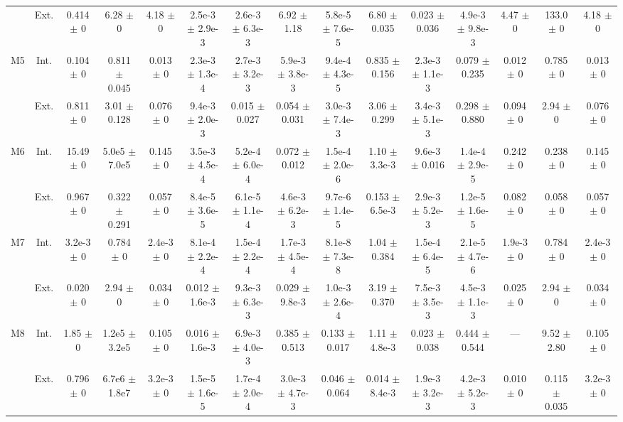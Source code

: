 \begin{table}[htbp]
{\begin{tabular}{@{}ccccccccccccccc@{}}
 & Ext. & 0.414 $\pm$ 0 & 6.28 $\pm$ 0 & 4.18 $\pm$ 0 & 2.5e-3 $\pm$ 2.9e-3 & 2.6e-3 $\pm$ 6.3e-3 & 6.92 $\pm$ 1.18 & 5.8e-5 $\pm$ 7.6e-5 & 6.80 $\pm$ 0.035 & 0.023 $\pm$ 0.036 & 4.9e-3 $\pm$ 9.8e-3 & 4.47 $\pm$ 0 & 133.0 $\pm$ 0 & 4.18 $\pm$ 0 \\
\cline{2-15}
\multirow{2}{*}{M5} & Int. & 0.104 $\pm$ 0 & 0.811 $\pm$ 0.045 & 0.013 $\pm$ 0 & 2.3e-3 $\pm$ 1.3e-4 & 2.7e-3 $\pm$ 3.2e-3 & 5.9e-3 $\pm$ 3.8e-3 & 9.4e-4 $\pm$ 4.3e-5 & 0.835 $\pm$ 0.156 & 2.3e-3 $\pm$ 1.1e-3 & 0.079 $\pm$ 0.235 & 0.012 $\pm$ 0 & 0.785 $\pm$ 0 & 0.013 $\pm$ 0 \\
 & Ext. & 0.811 $\pm$ 0 & 3.01 $\pm$ 0.128 & 0.076 $\pm$ 0 & 9.4e-3 $\pm$ 2.0e-3 & 0.015 $\pm$ 0.027 & 0.054 $\pm$ 0.031 & 3.0e-3 $\pm$ 7.4e-3 & 3.06 $\pm$ 0.299 & 3.4e-3 $\pm$ 5.1e-3 & 0.298 $\pm$ 0.880 & 0.094 $\pm$ 0 & 2.94 $\pm$ 0 & 0.076 $\pm$ 0 \\
\cline{2-15}
\multirow{2}{*}{M6} & Int. & 15.49 $\pm$ 0 & 5.0e5 $\pm$ 7.0e5 & 0.145 $\pm$ 0 & 3.5e-3 $\pm$ 4.5e-4 & 5.2e-4 $\pm$ 6.0e-4 & 0.072 $\pm$ 0.012 & 1.5e-4 $\pm$ 2.0e-6 & 1.10 $\pm$ 3.3e-3 & 9.6e-3 $\pm$ 0.016 & 1.4e-4 $\pm$ 2.9e-5 & 0.242 $\pm$ 0 & 0.238 $\pm$ 0 & 0.145 $\pm$ 0 \\
 & Ext. & 0.967 $\pm$ 0 & 0.322 $\pm$ 0.291 & 0.057 $\pm$ 0 & 8.4e-5 $\pm$ 3.6e-5 & 6.1e-5 $\pm$ 1.1e-4 & 4.6e-3 $\pm$ 6.2e-3 & 9.7e-6 $\pm$ 1.4e-5 & 0.153 $\pm$ 6.5e-3 & 2.9e-3 $\pm$ 5.2e-3 & 1.2e-5 $\pm$ 1.6e-5 & 0.082 $\pm$ 0 & 0.058 $\pm$ 0 & 0.057 $\pm$ 0 \\
\cline{2-15}
\multirow{2}{*}{M7} & Int. & 3.2e-3 $\pm$ 0 & 0.784 $\pm$ 0 & 2.4e-3 $\pm$ 0 & 8.1e-4 $\pm$ 2.2e-4 & 1.5e-4 $\pm$ 2.2e-4 & 1.7e-3 $\pm$ 4.5e-4 & 8.1e-8 $\pm$ 7.3e-8 & 1.04 $\pm$ 0.384 & 1.5e-4 $\pm$ 6.4e-5 & 2.1e-5 $\pm$ 4.7e-6 & 1.9e-3 $\pm$ 0 & 0.784 $\pm$ 0 & 2.4e-3 $\pm$ 0 \\
 & Ext. & 0.020 $\pm$ 0 & 2.94 $\pm$ 0 & 0.034 $\pm$ 0 & 0.012 $\pm$ 1.6e-3 & 9.3e-3 $\pm$ 6.3e-3 & 0.029 $\pm$ 9.8e-3 & 1.0e-3 $\pm$ 2.6e-4 & 3.19 $\pm$ 0.370 & 7.5e-3 $\pm$ 3.5e-3 & 4.5e-3 $\pm$ 1.1e-3 & 0.025 $\pm$ 0 & 2.94 $\pm$ 0 & 0.034 $\pm$ 0 \\
\cline{2-15}
\multirow{2}{*}{M8} & Int. & 1.85 $\pm$ 0 & 1.2e5 $\pm$ 3.2e5 & 0.105 $\pm$ 0 & 0.016 $\pm$ 1.6e-3 & 6.9e-3 $\pm$ 4.0e-3 & 0.385 $\pm$ 0.513 & 0.133 $\pm$ 0.017 & 1.11 $\pm$ 4.8e-3 & 0.023 $\pm$ 0.038 & 0.444 $\pm$ 0.544 & --- & 9.52 $\pm$ 2.80 & 0.105 $\pm$ 0 \\
 & Ext. & 0.796 $\pm$ 0 & 6.7e6 $\pm$ 1.8e7 & 3.2e-3 $\pm$ 0 & 1.5e-5 $\pm$ 1.6e-5 & 1.7e-4 $\pm$ 2.0e-4 & 3.0e-3 $\pm$ 4.7e-3 & 0.046 $\pm$ 0.064 & 0.014 $\pm$ 8.4e-3 & 1.9e-3 $\pm$ 3.2e-3 & 4.2e-3 $\pm$ 5.2e-3 & 0.010 $\pm$ 0 & 0.115 $\pm$ 0.035 & 3.2e-3 $\pm$ 0 \\

\end{tabular}}
\end{table}
